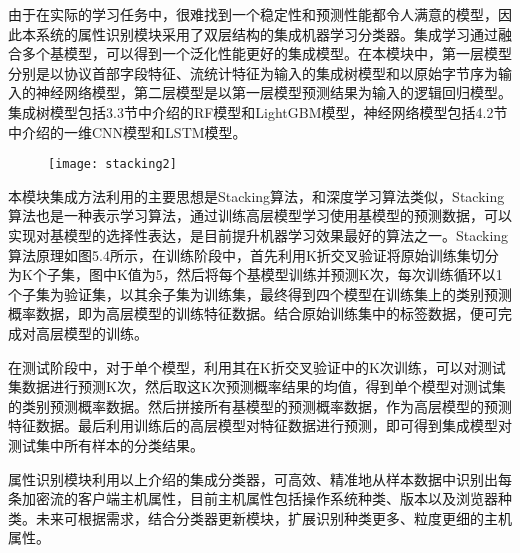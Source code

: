 由于在实际的学习任务中，很难找到一个稳定性和预测性能都令人满意的模型，因此本系统的属性识别模块采用了双层结构的集成机器学习分类器。集成学习通过融合多个基模型，可以得到一个泛化性能更好的集成模型。在本模块中，第一层模型分别是以协议首部字段特征、流统计特征为输入的集成树模型和以原始字节序为输入的神经网络模型，第二层模型是以第一层模型预测结果为输入的逻辑回归模型。集成树模型包括3.3节中介绍的RF模型和LightGBM模型，神经网络模型包括4.2节中介绍的一维CNN模型和LSTM模型。

\begin{figure}[!h]
    \centering
    \texttt{[image: stacking2]}
    \label{fig:5-3}
\end{figure}

本模块集成方法利用的主要思想是Stacking算法，和深度学习算法类似，Stacking算法也是一种表示学习算法，通过训练高层模型学习使用基模型的预测数据，可以实现对基模型的选择性表达，是目前提升机器学习效果最好的算法之一。Stacking算法原理如图5.4所示，在训练阶段中，首先利用K折交叉验证将原始训练集切分为K个子集，图中K值为5，然后将每个基模型训练并预测K次，每次训练循环以1个子集为验证集，以其余子集为训练集，最终得到四个模型在训练集上的类别预测概率数据，即为高层模型的训练特征数据。结合原始训练集中的标签数据，便可完成对高层模型的训练。

在测试阶段中，对于单个模型，利用其在K折交叉验证中的K次训练，可以对测试集数据进行预测K次，然后取这K次预测概率结果的均值，得到单个模型对测试集的类别预测概率数据。然后拼接所有基模型的预测概率数据，作为高层模型的预测特征数据。最后利用训练后的高层模型对特征数据进行预测，即可得到集成模型对测试集中所有样本的分类结果。


属性识别模块利用以上介绍的集成分类器，可高效、精准地从样本数据中识别出每条加密流的客户端主机属性，目前主机属性包括操作系统种类、版本以及浏览器种类。未来可根据需求，结合分类器更新模块，扩展识别种类更多、粒度更细的主机属性。

